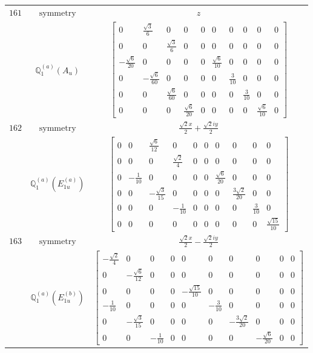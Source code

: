\documentclass[fleqn,8pt,landscape]{jsarticle}
\begin{document}
\begin{longtable}{ccc}
$ 161 $ & $ \text{symmetry} $ & $ z $ \\
$  $ & $ \mathbb{Q}_{1}^{(a)}(A_{u}) $ & $ \begin{bmatrix} 0 & \frac{\sqrt{3}}{6} & 0 & 0 & 0 & 0 & 0 & 0 & 0 & 0 \\ 0 & 0 & \frac{\sqrt{3}}{6} & 0 & 0 & 0 & 0 & 0 & 0 & 0 \\ - \frac{\sqrt{6}}{20} & 0 & 0 & 0 & 0 & \frac{\sqrt{6}}{10} & 0 & 0 & 0 & 0 \\ 0 & - \frac{\sqrt{6}}{60} & 0 & 0 & 0 & 0 & \frac{3}{10} & 0 & 0 & 0 \\ 0 & 0 & \frac{\sqrt{6}}{60} & 0 & 0 & 0 & 0 & \frac{3}{10} & 0 & 0 \\ 0 & 0 & 0 & \frac{\sqrt{6}}{20} & 0 & 0 & 0 & 0 & \frac{\sqrt{6}}{10} & 0 \end{bmatrix} $ \\ \hline
$ 162 $ & $ \text{symmetry} $ & $ \frac{\sqrt{2} x}{2} + \frac{\sqrt{2} i y}{2} $ \\
$  $ & $ \mathbb{Q}_{1}^{(a)}(E_{1u}^{(a)}) $ & $ \begin{bmatrix} 0 & 0 & \frac{\sqrt{6}}{12} & 0 & 0 & 0 & 0 & 0 & 0 & 0 \\ 0 & 0 & 0 & \frac{\sqrt{2}}{4} & 0 & 0 & 0 & 0 & 0 & 0 \\ 0 & - \frac{1}{10} & 0 & 0 & 0 & 0 & \frac{\sqrt{6}}{20} & 0 & 0 & 0 \\ 0 & 0 & - \frac{\sqrt{3}}{15} & 0 & 0 & 0 & 0 & \frac{3 \sqrt{2}}{20} & 0 & 0 \\ 0 & 0 & 0 & - \frac{1}{10} & 0 & 0 & 0 & 0 & \frac{3}{10} & 0 \\ 0 & 0 & 0 & 0 & 0 & 0 & 0 & 0 & 0 & \frac{\sqrt{15}}{10} \end{bmatrix} $ \\ \hline
$ 163 $ & $ \text{symmetry} $ & $ \frac{\sqrt{2} x}{2} - \frac{\sqrt{2} i y}{2} $ \\
$  $ & $ \mathbb{Q}_{1}^{(a)}(E_{1u}^{(b)}) $ & $ \begin{bmatrix} - \frac{\sqrt{2}}{4} & 0 & 0 & 0 & 0 & 0 & 0 & 0 & 0 & 0 \\ 0 & - \frac{\sqrt{6}}{12} & 0 & 0 & 0 & 0 & 0 & 0 & 0 & 0 \\ 0 & 0 & 0 & 0 & - \frac{\sqrt{15}}{10} & 0 & 0 & 0 & 0 & 0 \\ - \frac{1}{10} & 0 & 0 & 0 & 0 & - \frac{3}{10} & 0 & 0 & 0 & 0 \\ 0 & - \frac{\sqrt{3}}{15} & 0 & 0 & 0 & 0 & - \frac{3 \sqrt{2}}{20} & 0 & 0 & 0 \\ 0 & 0 & - \frac{1}{10} & 0 & 0 & 0 & 0 & - \frac{\sqrt{6}}{20} & 0 & 0 \end{bmatrix} $ \\ \hline

\end{longtable}
\end{document}
